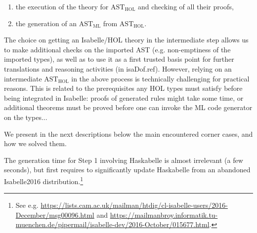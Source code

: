 \begin{isabellebody}
\begin{isamarkuptext}
\begin{enumerate}
\item the execution of the  theory for $\text{AST}_{\text{HOL}}$ and checking of all their
proofs,

\item the generation of an $\text{AST}_{\text{ML}}$ from $\text{AST}_{\text{HOL}}$.%
\end{enumerate}%
\end{isamarkuptext}\isamarkuptrue%
%
\begin{isamarkuptext}%
The choice on getting an Isabelle/HOL theory in the intermediate step allows us to make
additional checks on the imported AST (e.g. non-emptiness of the imported types), as well as to use
it as a first trusted basis point for further translations and reasoning activities (in \csname isaDof.ref). However, relying on an intermediate $\text{AST}_{\text{HOL}}$
in the above process is technically challenging for practical reasons. This is related to the
prerequisites any HOL types must satisfy before being integrated in Isabelle: proofs of generated
rules might take some time, or additional theorems must be proved before one can invoke the ML code
generator on the types...

We present in the next descriptions below the main encountered corner cases, and how we solved
them.%
\end{isamarkuptext}\isamarkuptrue%
%
\isadelimdocument
%
\endisadelimdocument
%
\isatagdocument
%
\isamarkuptrue%
%
\endisatagdocument
{\isafolddocument}%
%
\isadelimdocument
%
\endisadelimdocument
%
\begin{isamarkuptext}%
The generation time for Step 1 involving Haskabelle is almost irrelevant (a few
seconds), but first requires to significantly update Haskabelle from an abandoned Isabelle2016
distribution.\footnote{See
  e.g. \url{https://lists.cam.ac.uk/mailman/htdig/cl-isabelle-users/2016-December/msg00096.html}
  and
  \url{https://mailmanbroy.informatik.tu-muenchen.de/pipermail/isabelle-dev/2016-October/015677.html}.}


\end{isamarkuptext}
\end{isabellebody}

